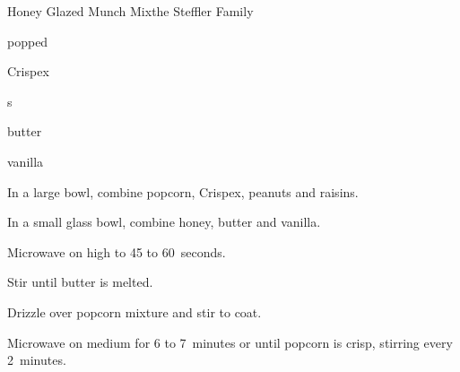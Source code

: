 \begin{recipe}{Honey Glazed Munch Mix}{the Steffler Family}{}

\begin{ingredients}
\item {} popped 
\item {} Crispex 
\item \C{\half} s
\item \C{\quarter} 
\item \C{\quarter} 
\item \C{\quarter} butter
\item \tp{\quarter} vanilla
\end{ingredients}

\begin{directions}
\item In a large bowl, combine popcorn, Crispex, peanuts and raisins.
\item In a small glass bowl, combine honey, butter and vanilla.
\item Microwave on high to 45 to 60~seconds.
\item Stir until butter is melted.
\item Drizzle over popcorn mixture and stir to coat.
\item Microwave on medium for 6 to 7~minutes or until popcorn is crisp, stirring every 2~minutes.
\end{directions}
\end{recipe}
